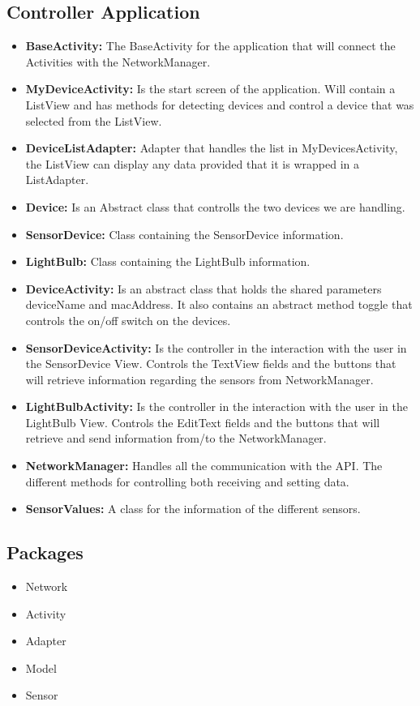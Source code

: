 \documentclass[a4paper]{article}
\begin{document}
	\subsection{Controller Application}
	\begin{itemize}
		\item{\textbf{BaseActivity:}} 
		The BaseActivity for the application that will connect the Activities with the NetworkManager.
		\item{\textbf{MyDeviceActivity:}} 
		Is the start screen of the application. Will contain a ListView and has methods for detecting devices and control a device that was selected from the ListView.
		\item{\textbf{DeviceListAdapter:}} 
		Adapter that handles the list in MyDevicesActivity, the ListView can display any data provided that it is wrapped in a ListAdapter. 
		\item{\textbf{Device:}} 
		Is an Abstract class that controlls the two devices we are handling. 
		\item{\textbf{SensorDevice:}} 
		Class containing the SensorDevice information.
		\item{\textbf{LightBulb:}}
		Class containing the LightBulb information.
		\item{\textbf{DeviceActivity:}} 
		Is an abstract class that holds the shared parameters deviceName and macAddress. It also contains an abstract method toggle that controls the on/off switch on the devices.
		\item{\textbf{SensorDeviceActivity:}} 
		Is the controller in the interaction with the user in the SensorDevice View. Controls the TextView fields and the buttons that will retrieve information regarding the sensors from NetworkManager.
		\item{\textbf{LightBulbActivity:}} 
		Is the controller in the interaction with the user in the LightBulb View. Controls the EditText fields and the buttons that will retrieve and send information from/to the NetworkManager.
		
		\item{\textbf{NetworkManager:}} 
		Handles all the communication with the API. The different methods for controlling both receiving and setting data.
		\item{\textbf{SensorValues:}} 
		A class for the information of the different sensors.
		
	\end{itemize}

	\subsection{Packages}
	\begin{itemize}
		\item Network
		\item Activity
		\item Adapter
		\item Model
		\item Sensor
	\end{itemize}
\end{document}
